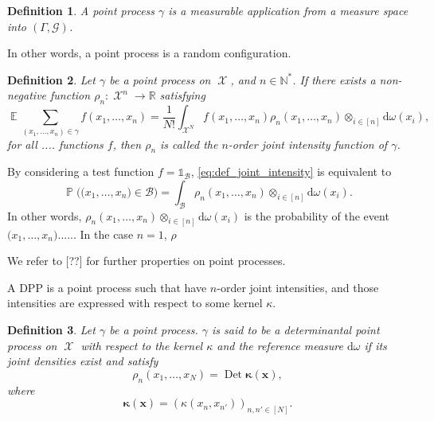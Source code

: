 \documentclass[twoside,11pt]{book}
\newtheorem{definition}{Definition}
\numberwithin{theorem}{chapter}
\numberwithin{definition}{chapter}
\numberwithin{proposition}{chapter}
\numberwithin{corollary}{chapter}
\numberwithin{example}{chapter}
\numberwithin{lemma}{chapter}
\numberwithin{assumption}{chapter}
\DeclareMathOperator{\Det}{Det}
\DeclareMathOperator{\EX}{\mathbb{E}}
\DeclareMathOperator{\Prb}{\mathbb{P}}
\DeclareMathOperator{\X}{\mathcal{X}}
\begin{document}
\begin{definition}
A point process $\gamma$ is a measurable application from a measure space into $(\Gamma, \mathcal{G})$.
\end{definition}

In other words, a point process is a random configuration.  

\begin{definition}
Let $\gamma$ be a point process on $\X$, and $n \in \mathbb{N}^{*}$. If there exists a non-negative function $\rho_{n}: \X^{n} \rightarrow \mathbb{R} $ satisfying 
\begin{equation}\label{eq:def_joint_intensity}
\EX \sum\limits_{(x_{1}, \dots, x_{n}) \in \gamma } f(x_{1}, \dots, x_{n}) = \frac{1}{N!} \int_{\X^{N}} f(x_{1}, \dots, x_{n}) \rho_{n}(x_{1}, \dots, x_{n}) \otimes_{i \in [n]} \mathrm{d}\omega(x_{i}),
\end{equation}
for all .... functions $f$, then $\rho_{n}$ is called the $n$-order joint intensity function of $\gamma$.
\end{definition}
By considering a test function $f = \mathbb{1}_{\mathcal{B}}$, \eqref{eq:def_joint_intensity} is equivalent to 
\begin{equation}
\Prb \bigg(\big(x_{1}, \dots, x_{n} \big) \in \mathcal{B} \bigg) = \int_{\mathcal{B}} \rho_{n}(x_{1}, \dots, x_{n}) \otimes_{i \in [n]}\mathrm{d}\omega(x_{i}).
\end{equation}
In other words, $\rho_{n}(x_{1}, \dots, x_{n}) \otimes_{i \in [n]}\mathrm{d}\omega(x_{i})$ is the probability of the event $\big(x_{1}, \dots, x_{n} \big)...$...
In the case $n = 1$, $\rho$

We refer to [??] for further properties on point processes.


A DPP is a point process such that have $n$-order joint intensities, and those intensities are expressed with respect to some kernel $\kappa$.
\begin{definition}\label{eq:def_dpp}
Let $\gamma$ be a point process. $\gamma$ is said to be a determinantal point process on $\X$ with respect to the kernel $\kappa$ and the reference measure $\mathrm{d}\omega$ if its joint densities exist and satisfy
\begin{equation}
\rho_{n}(x_{1}, \dots, x_{N}) = \Det \bm{\kappa}(\bm{x}),
\end{equation}
where
\begin{equation}
\bm{\kappa}(\bm{x}) = (\kappa(x_{n},x_{n'}))_{n,n' \in [N]}.
\end{equation}
\end{definition}
\end{document}

